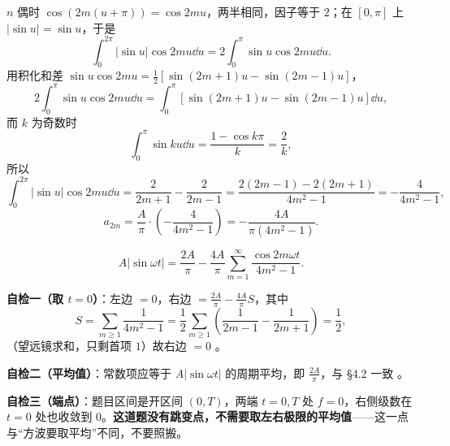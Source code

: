 \documentclass[11pt]{ctexart}
\begin{document}



$n$ 偶时 $\cos\left(2m(u+\pi)\right)=\cos 2mu$，两半相同，因子等于 $2$；在 $\left[0,\pi\right]$ 上 $|\sin u|=\sin u$，于是
\[
\int_0^{2\pi}\left|\sin u\right|\cos 2mu\dd u
=2\int_0^{\pi}\sin u\cos 2mu\dd u .
\]
用积化和差 $\sin u\cos 2mu=\frac12\left[\sin(2m+1)u-\sin(2m-1)u\right]$，
\[
2\int_0^{\pi}\sin u\cos 2mu\dd u
=\int_0^{\pi}\left[\sin(2m+1)u-\sin(2m-1)u\right]\dd u ,
\]
而 $k$ 为奇数时
\[
\int_0^{\pi}\sin ku\dd u=\frac{1-\cos k\pi}{k}=\frac2k ,
\]
所以
\[
\int_0^{2\pi}\left|\sin u\right|\cos 2mu\dd u
=\frac{2}{2m+1}-\frac{2}{2m-1}
=\frac{2(2m-1)-2(2m+1)}{4m^2-1}
=-\frac{4}{4m^2-1},
\]
\[
a_{2m}=\frac{A}{\pi}\cdot\left(-\frac{4}{4m^2-1}\right)=-\frac{4A}{\pi\left(4m^2-1\right)} .
\]


\[
A\left|\sin\omega t\right|
=\frac{2A}{\pi}-\frac{4A}{\pi}\sum_{m=1}^{\infty}\frac{\cos 2m\omega t}{4m^2-1} .
\]

\textbf{自检一（取 $t=0$）}：左边 $=0$，右边 $=\frac{2A}{\pi}-\frac{4A}{\pi}S$，其中
\[
S=\sum_{m\ge1}\frac{1}{4m^2-1}
=\frac12\sum_{m\ge1}\left(\frac{1}{2m-1}-\frac{1}{2m+1}\right)
=\frac12 ,
\]
（望远镜求和，只剩首项 $1$）故右边 $=0$ \checkmark。

\textbf{自检二（平均值）}：常数项应等于 $A\left|\sin\omega t\right|$ 的周期平均，即 $\frac{2A}{\pi}$，与 §4.2 一致 \checkmark。

\textbf{自检三（端点）}：题目区间是开区间 $(0,T)$，两端 $t=0,T$ 处 $f=0$，右侧级数在 $t=0$ 处也收敛到 $0$。\textbf{这道题没有跳变点，不需要取左右极限的平均值}——这一点与“方波要取平均”不同，不要照搬。

\end{document}
